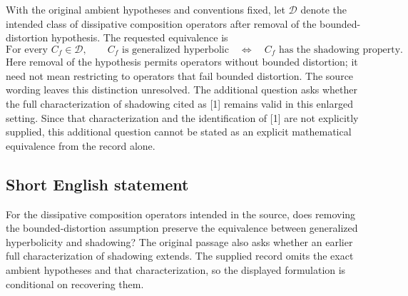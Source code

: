 \documentclass[11pt]{article}
\begin{document}
With the original ambient hypotheses and conventions fixed, let \(\mathcal D\) denote the intended class of dissipative composition operators after removal of the bounded-distortion hypothesis. The requested equivalence is
\[
\text{For every }C_f\in\mathcal D,\qquad
C_f\text{ is generalized hyperbolic}
\quad\Longleftrightarrow\quad
C_f\text{ has the shadowing property}.
\]
Here removal of the hypothesis permits operators without bounded distortion; it need not mean restricting to operators that fail bounded distortion. The source wording leaves this distinction unresolved. The additional question asks whether the full characterization of shadowing cited as [1] remains valid in this enlarged setting. Since that characterization and the identification of [1] are not explicitly supplied, this additional question cannot be stated as an explicit mathematical equivalence from the record alone.
\subsection{Short English statement}
For the dissipative composition operators intended in the source, does removing the bounded-distortion assumption preserve the equivalence between generalized hyperbolicity and shadowing? The original passage also asks whether an earlier full characterization of shadowing extends. The supplied record omits the exact ambient hypotheses and that characterization, so the displayed formulation is conditional on recovering them.
\end{document}
